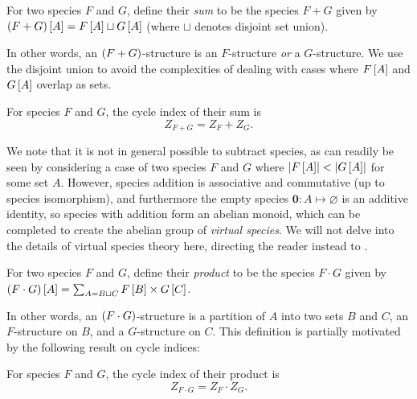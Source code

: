 \documentclass[sectionflow,singlespace,twoside,boldmathhdr]{brandiss} %
\numberwithin{section}{chapter}
\numberwithin{figure}{chapter}
\begin{document}
\begin{definition}\label{def:specsum}
  For two species $F$ and $G$, define their \emph{sum} to be the species $F + G$ given by $\left( {F + G} \right) \left[ {A} \right] = F \left[ {A} \right] \sqcup G \left[ {A} \right]$ (where $\sqcup$ denotes disjoint set union).
\end{definition}
In other words, an $\left( {F + G} \right)$-structure is an $F$-structure \emph{or} a $G$-structure.
We use the disjoint union to avoid the complexities of dealing with cases where $F \left[ {A} \right]$ and $G \left[ {A} \right]$ overlap as sets.

\begin{theorem}\label{thm:specsumci}
  For species $F$ and $G$, the cycle index of their sum is
  \begin{equation}
    \label{eq:specsumci}
    Z_{F + G} = Z_{F} + Z_{G}.
  \end{equation}
\end{theorem}

We note that it is not in general possible to subtract species, as can readily be seen by considering a case of two species $F$ and $G$ where $\left\vert {F \ensuremath{\left[ {A} \right]}} \right\vert < \left\vert {G \ensuremath{\left[ {A} \right]}} \right\vert$ for some set $A$.
However, species addition is associative and commutative (up to species isomorphism), and furthermore the empty species $\mathbf{0}: A \mapsto \varnothing$ is an additive identity, so species with addition form an abelian monoid, which can be completed to create the abelian group of \emph{virtual species}.
We will not delve into the details of virtual species theory here, directing the reader instead to \cite[\S 2.5]{bll:species}.

\begin{definition}\label{thm:specprod}
  For two species $F$ and $G$, define their \emph{product} to be the species $F \cdot G$ given by $\left( {F \cdot G} \right) \left[ {A} \right] = \sum_{A = B \sqcup C} F \left[ {B} \right] \times G \left[ {C} \right]$.
\end{definition}
In other words, an $\left( {F \cdot G} \right)$-structure is a partition of $A$ into two sets $B$ and $C$, an $F$-structure on $B$, and a $G$-structure on $C$.
This definition is partially motivated by the following result on cycle indices:
\begin{theorem}\label{thm:specprodci}
  For species $F$ and $G$, the cycle index of their product is
  \begin{equation}
    \label{eq:specprodci}
    Z_{F \cdot G} = Z_{F} \cdot Z_{G}.
  \end{equation}
\end{theorem}
\end{document}
